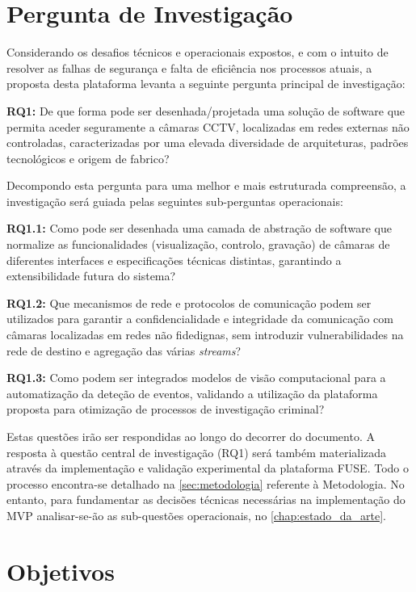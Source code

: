 \section{Pergunta de Investigação}
\label{sec:pergunta_investigacao}

Considerando os desafios técnicos e operacionais expostos, e com o intuito de resolver as falhas de segurança e falta de eficiência nos processos atuais, a proposta desta plataforma levanta a seguinte pergunta principal de investigação:

\textbf{RQ1:} De que forma pode ser desenhada/projetada uma solução de software que permita aceder seguramente a câmaras \gls{CCTV}, localizadas em redes externas não controladas, caracterizadas por uma elevada diversidade de arquiteturas, padrões tecnológicos e origem de fabrico?

Decompondo esta pergunta para uma melhor e mais estruturada compreensão, a investigação será guiada pelas seguintes sub-perguntas operacionais:

\textbf{RQ1.1:} Como pode ser desenhada uma camada de abstração de software que normalize as funcionalidades (visualização, controlo, gravação) de câmaras de diferentes interfaces e especificações técnicas distintas, garantindo a extensibilidade futura do sistema?

\textbf{RQ1.2:} Que mecanismos de rede e protocolos de comunicação podem ser utilizados para garantir a confidencialidade e integridade da comunicação com câmaras localizadas em redes não fidedignas, sem introduzir vulnerabilidades na rede de destino e agregação das várias \textit{streams}?

\textbf{RQ1.3:} Como podem ser integrados modelos de visão computacional para a automatização da deteção de eventos, validando a utilização da plataforma proposta para otimização de processos de investigação criminal?

Estas questões irão ser respondidas ao longo do decorrer do documento. A resposta à questão central de investigação (RQ1) será também materializada através da implementação e validação experimental da plataforma \gls{FUSE}. Todo o processo encontra-se detalhado na \autoref{sec:metodologia} referente à Metodologia. No entanto, para fundamentar as decisões técnicas necessárias na implementação do \gls{MVP} analisar-se-ão as sub-questões operacionais, no \autoref{chap:estado_da_arte}.

\section{Objetivos}
\label{sec:objetivos}

